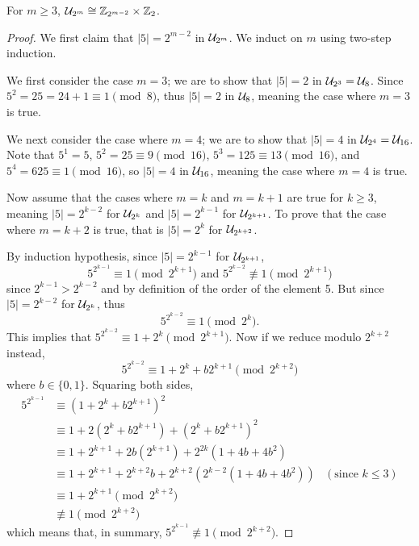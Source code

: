 \begin{proposition}\label{prop-Un-2^m}
    For $m \geq 3$, $\mathcal{U}_{2^m} \cong \mathbb{Z}_{2^{m-2}} \times \mathbb{Z}_2$.
\end{proposition}
\begin{proof}
    We first claim that $|5| = 2^{m-2}$ in $\mathcal{U}_{2^m}$. We induct on $m$ using two-step induction.

    We first consider the case $m = 3$; we are to show that $|5| = 2$ in $\mathcal{U}_{2^3} = \mathcal{U}_{8}$. Since $5^2 = 25 = 24 + 1 \equiv 1 \pmod{8}$, thus $|5| = 2$ in $\mathcal{U}_{8}$, meaning the case where $m = 3$ is true.

    We next consider the case where $m = 4$; we are to show that $|5| = 4$ in $\mathcal{U}_{2^4} = \mathcal{U}_{16}$. Note that $5^1 = 5$, $5^2 = 25 \equiv 9 \pmod{16}$, $5^3 = 125 \equiv 13 \pmod{16}$, and $5^4 = 625 \equiv 1 \pmod{16}$, so $|5| = 4$ in $\mathcal{U}_{16}$, meaning the case where $m = 4$ is true.

    Now assume that the cases where $m = k$ and $m = k+1$ are true for $k \geq 3$, meaning $|5| = 2^{k-2}$ for $\mathcal{U}_{2^k}$ and $|5| = 2^{k-1}$ for $\mathcal{U}_{2^{k+1}}$. To prove that the case where $m=k+2$ is true, that is $|5| = 2^k$ for $\mathcal{U}_{2^{k+2}}$.

    By induction hypothesis, since $|5| = 2^{k-1}$ for $\mathcal{U}_{2^{k+1}}$,
    \[
        5^{2^{k-1}} \equiv 1 \pmod{2^{k+1}} \text{ and } 5^{2^{k-2}} \not\equiv 1 \pmod{2^{k+1}}
    \]
    since $2^{k-1} > 2^{k-2}$ and by definition of the order of the element 5. But since $|5| = 2^{k-2}$ for $\mathcal{U}_{2^k}$, thus
    \[
        5^{2^{k-2}} \equiv 1 \pmod{2^k}.
    \]
    This implies that $5^{2^{k-2}} \equiv 1 + 2^k \pmod{2^{k+1}}$. Now if we reduce modulo $2^{k+2}$ instead,
    \[
            5^{2^{k-2}} \equiv 1 + 2^k + b2^{k+1} \pmod{2^{k+2}}
    \]
    where $b \in \{0, 1\}$. Squaring both sides,
    \begin{align*}
        5^{2^{k-1}} &\equiv \left(1+2^k+b2^{k+1}\right)^2\\
        &\equiv 1 + 2\left(2^k + b2^{k+1}\right) + \left(2^k + b2^{k+1}\right)^2\\
        &\equiv 1 + 2^{k+1} + 2b(2^{k+1}) + 2^{2k}(1+4b+4b^2)\\
        &\equiv 1 + 2^{k+1} + 2^{k+2}b + 2^{k+2}\left(2^{k-2}(1+4b+4b^2)\right) & (\text{since } k\leq 3)\\
        &\equiv 1+2^{k+1} \pmod{2^{k+2}}\\
        &\not\equiv 1 \pmod{2^{k+2}}
    \end{align*}
    which means that, in summary, $5^{2^{k-1}} \not\equiv 1 \pmod{2^{k+2}}$.


\end{proof}
